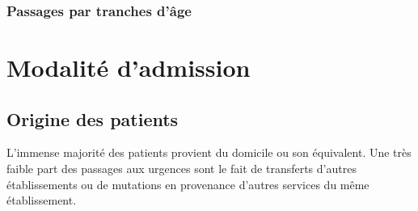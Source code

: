 \documentclass[12pt,english,french,twoside]{report}\usepackage[]{graphicx}\usepackage[]{color}
\begin{document}
\subsection{Passages par tranches d'âge}

\chapter{Modalité d'admission}



\section*{Origine des patients}

L'immense majorité des patients provient du domicile ou son équivalent. Une très faible part des passages aux urgences sont le fait de transferts d'autres établissements ou de mutations en provenance d'autres services du même établissement.
\end{document}
